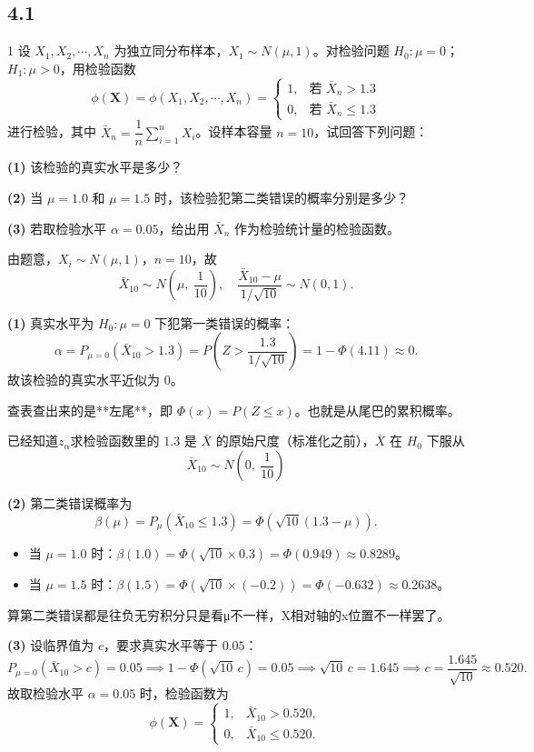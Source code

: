 \subsection{4.1}
\begin{homework}{1}
设 $X_1, X_2, \cdots, X_n$ 为独立同分布样本，$X_1 \sim N(\mu, 1)$。对检验问题 $H_0: \mu = 0$；$H_1: \mu > 0$，用检验函数
$$\phi(\boldsymbol{X}) = \phi(X_1, X_2, \cdots, X_n) = \begin{cases} 1, & \text{若 } \bar{X}_n > 1.3 \\ 0, & \text{若 } \bar{X}_n \leq 1.3 \end{cases}$$
进行检验，其中 $\bar{X}_n = \dfrac{1}{n}\displaystyle\sum_{i=1}^n X_i$。设样本容量 $n = 10$，试回答下列问题：

\textbf{(1)} 该检验的真实水平是多少？

\textbf{(2)} 当 $\mu = 1.0$ 和 $\mu = 1.5$ 时，该检验犯第二类错误的概率分别是多少？

\textbf{(3)} 若取检验水平 $\alpha = 0.05$，给出用 $\bar{X}_n$ 作为检验统计量的检验函数。
\end{homework}
\begin{solution}
由题意，$X_i \sim N(\mu, 1)$，$n = 10$，故
\[
\bar{X}_{10} \sim N\!\left(\mu,\ \frac{1}{10}\right), \quad \frac{\bar{X}_{10} - \mu}{1/\sqrt{10}} \sim N(0,1).
\]

\textbf{(1)} 真实水平为 $H_0: \mu = 0$ 下犯第一类错误的概率：
\[
\alpha = P_{\mu=0}(\bar{X}_{10} > 1.3)
= P\!\left(Z > \frac{1.3}{1/\sqrt{10}}\right)
= 1 - \Phi(4.11) \approx 0.
\]
故该检验的真实水平近似为 $0$。
\begin{dxtips}
    查表查出来的是**左尾**，即 $\Phi(x) = P(Z \leq x)$。也就是从尾巴的累积概率。
\end{dxtips}
\begin{dxtips}
    已经知道$z_\alpha$求检验函数里的 $1.3$ 是 $\bar{X}$ 的原始尺度（标准化之前），$\bar{X}$ 在 $H_0$ 下服从
\[
\bar{X}_{10} \sim N\!\left(0,\ \frac{1}{10}\right)
\]

\end{dxtips}
\textbf{(2)} 第二类错误概率为
\[
\beta(\mu) = P_\mu(\bar{X}_{10} \leq 1.3)
= \Phi\!\left(\sqrt{10}(1.3 - \mu)\right).
\]
\begin{itemize}
  \item 当 $\mu = 1.0$ 时：$\beta(1.0) = \Phi(\sqrt{10} \times 0.3) = \Phi(0.949) \approx 0.8289$。
  \item 当 $\mu = 1.5$ 时：$\beta(1.5) = \Phi(\sqrt{10} \times (-0.2)) = \Phi(-0.632) \approx 0.2638$。
\end{itemize}
\begin{dxtips}
    算第二类错误都是往负无穷积分只是看μ不一样，X相对轴的x位置不一样罢了。
\end{dxtips}
\textbf{(3)} 设临界值为 $c$，要求真实水平等于 $0.05$：
\[
P_{\mu=0}(\bar{X}_{10} > c) = 0.05
\implies 1 - \Phi(\sqrt{10}\, c) = 0.05
\implies \sqrt{10}\, c = 1.645
\implies c = \frac{1.645}{\sqrt{10}} \approx 0.520.
\]
故取检验水平 $\alpha = 0.05$ 时，检验函数为
\[
\phi(\boldsymbol{X}) = \begin{cases} 1, & \bar{X}_{10} > 0.520, \\ 0, & \bar{X}_{10} \leq 0.520. \end{cases}
\]
\end{solution}
